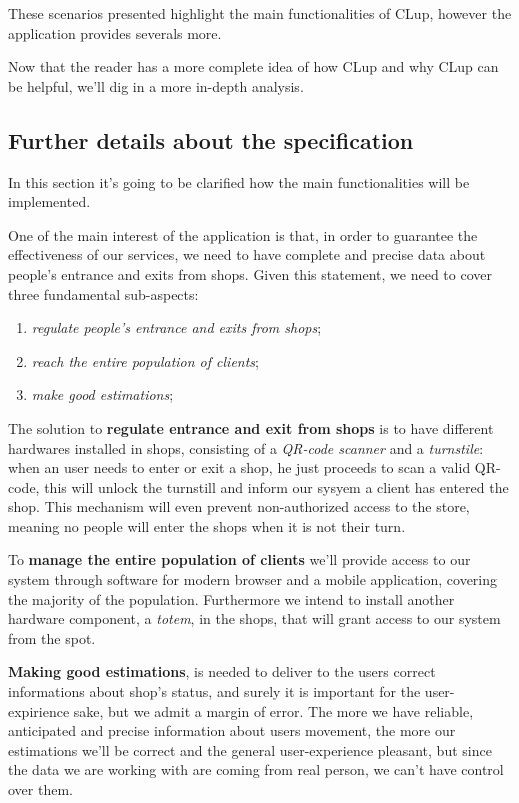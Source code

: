 These scenarios presented highlight the main functionalities of CLup, however the application provides severals more. 

Now that the reader has a more complete idea of how CLup and why CLup can be helpful, we'll dig in a more in-depth analysis.
\subsection{Further details about the specification}
\label{subsect:furtherdetailsaboutspecification}

In this section it's going to be clarified how the main functionalities will be implemented.

One of the main interest of the application is that, in order to guarantee the effectiveness of our services, we need to have complete and precise data about people's entrance and exits from shops. Given this statement, we need to cover three fundamental sub-aspects:
\begin{enumerate}[topsep=0pt]
    \item \textit{regulate people's entrance and exits from shops};
    \item \textit{reach the entire population of clients};
    \item \textit{make good estimations};
\end{enumerate}

The solution to \textbf{regulate entrance and exit from shops} is to have different hardwares installed in shops, consisting of a \textit{QR-code scanner} and a \textit{turnstile}: when an user needs to enter or exit a shop, he just proceeds to scan a valid QR-code, this will unlock the turnstill and inform our sysyem a client has entered the shop. This mechanism will even prevent non-authorized access to the store, meaning no people will enter the shops when it is not their turn.

To \textbf{manage the entire population of clients} we'll provide access to our system through software for modern browser and a mobile application, covering the majority of the population. Furthermore we intend to install another hardware component, a \textit{totem}, in the shops, that will grant access to our system from the spot.

\textbf{Making good estimations}, is needed to deliver to the users correct informations about shop's status, and surely it is important for the user-expirience sake, but we admit a margin of error. The more we have reliable, anticipated and precise information about users movement, the more our estimations we'll be correct and the general user-experience pleasant, but since the data we are working with are coming from real person, we can't have control over them. 


